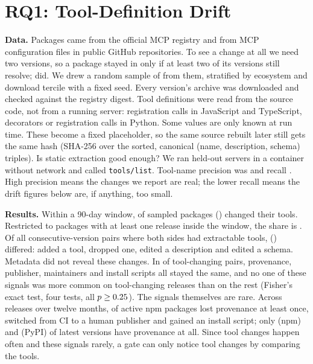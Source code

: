 \documentclass[conference]{IEEEtran}
\newcommand{\code}[1]{\texttt{#1}}
\begin{document}
\section{RQ1: Tool-Definition Drift}
\label{sec:census}
\textbf{Data.} Packages came from the official MCP registry and from MCP configuration files in public GitHub
repositories. To see a change at all we need two versions, so a package stayed in only if at least two of its versions
still resolve; \MetaPkgs{} did. We drew a random sample of \CensusSample{} from them, stratified by ecosystem and
download tercile with a fixed seed. Every version's archive was downloaded and checked against the registry digest.
Tool definitions were read from the source code, not from a running server: registration calls in JavaScript and
TypeScript, decorators or registration calls in Python. Some values are only known at run time. These become a fixed
placeholder, so the same source rebuilt later still gets the same hash (SHA-256 over the sorted, canonical
(name, description, schema) triples). Is static extraction good enough? We ran \ValN{} held-out servers in a container
without network and called \code{tools/list}. Tool-name precision was \ValPrec{} and recall \ValRec. High precision
means the changes we report are real; the lower recall means the drift figures below are, if anything, too small.

\textbf{Results.} Within a 90-day window, \DriftPkgsP{} \DriftPkgsCI{} of sampled packages (\DriftPkgs) changed their
tools. Restricted to packages with at least one release inside the window, the share is \DriftWinRelP{}
\DriftWinRelCI. Of all consecutive-version pairs where both sides had extractable tools, \DriftTransP{} (\DriftTrans)
differed: \KindAdded{} added a tool, \KindRemoved{} dropped one, \KindDesc{} edited a description and \KindSchema{}
edited a schema. Metadata did not reveal these changes. In \NoSignalP{} \NoSignalCI{} of tool-changing pairs, provenance,
publisher, maintainers and install scripts all stayed the same, and no one of these signals was more common on
tool-changing releases than on the rest (Fisher's exact test, four tests, all $p \ge 0.25$). The signals
themselves are rare. Across \MetaTrans{} releases over twelve months, \MetaProvLostNpmP{} of active npm packages lost
provenance at least once, \MetaCiHumanP{} switched from CI to a human publisher and \MetaInstallNpmP{} gained an install
script; only \MetaLatestProvNpmP{} (npm) and \MetaLatestProvPyP{} (PyPI) of latest versions have provenance at all. Since tool changes happen often and these signals
rarely, a gate can only notice tool changes by comparing the tools.
\end{document}
